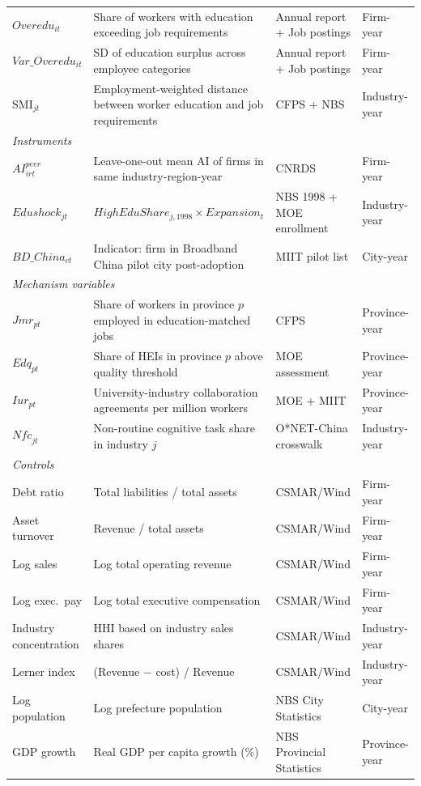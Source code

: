 \documentclass[12pt,a4paper]{article}
\theoremstyle{predstyle}
\theoremstyle{plain}
\newcommand{\SMI}{\mathrm{SMI}}
\newcommand{\Overedu}{\mathit{Overedu}}
\newcommand{\Jmr}{\mathit{Jmr}}
\newcommand{\Edq}{\mathit{Edq}}
\newcommand{\Nfc}{\mathit{Nfc}}
\begin{document}
\begin{appendices}
\begin{longtable}{p{3.5cm}p{5.5cm}p{3cm}p{2cm}}
$\Overedu_{it}$ & Share of workers with education exceeding job requirements & Annual report + Job postings & Firm-year \\
$Var\_\Overedu_{it}$ & SD of education surplus across employee categories & Annual report + Job postings & Firm-year \\
$\SMI_{jt}$ & Employment-weighted distance between worker education and job requirements & CFPS + NBS & Industry-year \\
\midrule
\multicolumn{4}{l}{\textit{Instruments}} \\
$AI^{peer}_{irt}$ & Leave-one-out mean AI of firms in same industry-region-year & CNRDS & Firm-year \\
$Edushock_{jt}$ & $HighEduShare_{j,1998} \times Expansion_t$ & NBS 1998 + MOE enrollment & Industry-year \\
$BD\_China_{ct}$ & Indicator: firm in Broadband China pilot city post-adoption & MIIT pilot list & City-year \\
\midrule
\multicolumn{4}{l}{\textit{Mechanism variables}} \\
$\Jmr_{pt}$ & Share of workers in province $p$ employed in education-matched jobs & CFPS & Province-year \\
$\Edq_{pt}$ & Share of HEIs in province $p$ above quality threshold & MOE assessment & Province-year \\
$\mathit{Iur}_{pt}$ & University-industry collaboration agreements per million workers & MOE + MIIT & Province-year \\
$\Nfc_{jt}$ & Non-routine cognitive task share in industry $j$ & O*NET-China crosswalk & Industry-year \\
\midrule
\multicolumn{4}{l}{\textit{Controls}} \\
Debt ratio & Total liabilities / total assets & CSMAR/Wind & Firm-year \\
Asset turnover & Revenue / total assets & CSMAR/Wind & Firm-year \\
Log sales & Log total operating revenue & CSMAR/Wind & Firm-year \\
Log exec.\ pay & Log total executive compensation & CSMAR/Wind & Firm-year \\
Industry concentration & HHI based on industry sales shares & CSMAR/Wind & Industry-year \\
Lerner index & (Revenue $-$ cost) / Revenue & CSMAR/Wind & Industry-year \\
Log population & Log prefecture population & NBS City Statistics & City-year \\
GDP growth & Real GDP per capita growth (\%) & NBS Provincial Statistics & Province-year \\
\end{longtable}
\endgroup


\end{appendices}
\end{document}
